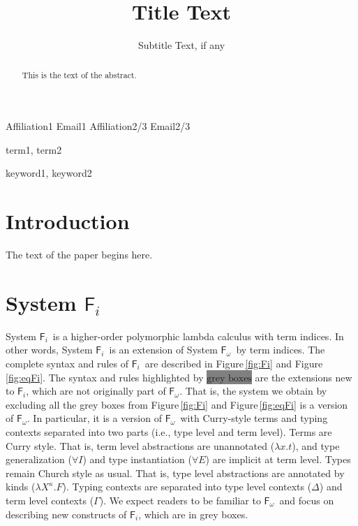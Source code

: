 \documentclass[preprint]{sigplanconf}
\newcommand{\Fig}[1]{Figure\,\ref{fig:#1}}
\newcommand{\newFi}[1]{\colorbox{grey}{\ensuremath{#1}}}
\newcommand{\ie}{{i.e.}}
\newcommand{\Fi}{\ensuremath{\mathsf{F}_i}}
\newcommand{\Fw}{\ensuremath{\mathsf{F}_\omega}}
\theoremstyle{plain}
\theoremstyle{remark}
\theoremstyle{definition}
\begin{document}
\copyrightdata{[to be supplied]} 


\title{Title Text}
\subtitle{Subtitle Text, if any}

           {Affiliation1}
           {Email1}
           {Affiliation2/3}
           {Email2/3}

\maketitle

\begin{abstract}
This is the text of the abstract.
\end{abstract}


\terms
term1, term2

\keywords
keyword1, keyword2

\section{Introduction}

The text of the paper begins here.


\section{System \Fi}
\label{sec:Fi}
System \Fi\ is a higher-order polymorphic lambda calculus with term indices.
In other words, System \Fi\ is an extension of System \Fw\ by term indices.
The complete syntax and rules of \Fi\ are described in \Fig{Fi} and
\Fig{eqFi}. The syntax and rules highlighted by \newFi{\text{grey boxes}}
are the extensions new to \Fi, which are not originally part of \Fw.
That is, the system we obtain by excluding all the grey boxes from \Fig{Fi}
and \Fig{eqFi} is a version of \Fw. In particular, it is a version of \Fw\
with Curry-style terms and typing contexts separated into two parts
(\ie, type level and term level). Terms are Curry style. That is,
term level abstractions are unannotated ($\lambda x.t$), and
type generalization ($\forall I$) and type instantiation ($\forall E$) are
implicit at term level. Types remain Church style as usual. That is,
type level abstractions are annotated by kinds ($\lambda X^\kappa.F$).
Typing contexts are separated into type level contexts ($\Delta$) and
term level contexts ($\Gamma$). We expect readers to be familiar to \Fw\
and focus on describing new constructs of \Fi, which are in grey boxes.
\end{document}
